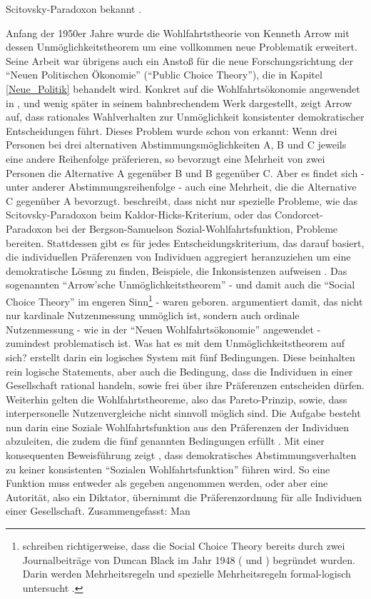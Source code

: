 Scitovsky-Paradoxon bekannt \parencite[S. 12]{Suzumura2016}.

Anfang der 1950er Jahre wurde die Wohlfahrtstheorie von Kenneth Arrow mit dessen Unmöglichkeitstheorem um eine vollkommen neue Problematik erweitert. Seine Arbeit war übrigens auch ein Anstoß für die neue Forschungsrichtung der "`Neuen Politischen Ökonomie"' ("`Public Choice Theory"'), die in Kapitel \ref{Neue_Politik} behandelt wird. Konkret auf die Wohlfahrtsökonomie angewendet in \textcite[S. 329]{Arrow1950}, und wenig später in seinem bahnbrechendem Werk \parencite{Arrow1951} dargestellt, zeigt Arrow auf, dass rationales Wahlverhalten zur Unmöglichkeit konsistenter demokratischer Entscheidungen führt. Dieses Problem wurde schon von \textcite{Condorcet1785} erkannt: Wenn drei Personen bei drei alternativen Abstimmungsmöglichkeiten A, B und C jeweils eine andere Reihenfolge präferieren, so bevorzugt eine Mehrheit von zwei Personen die Alternative A gegenüber B und B gegenüber C. Aber es findet sich - unter anderer Abstimmungsreihenfolge - auch eine Mehrheit, die die Alternative C gegenüber A bevorzugt. \textcite{Arrow1950} beschreibt, dass nicht nur spezielle Probleme, wie das Scitovsky-Paradoxon beim Kaldor-Hicks-Kriterium, oder das Condorcet-Paradoxon bei der Bergson-Samuelson Sozial-Wohlfahrtsfunktion, Probleme bereiten. Stattdessen gibt es für jedes Entscheidungskriterium, das darauf basiert, die individuellen Präferenzen von Individuen aggregiert heranzuziehen um eine demokratische Lösung zu finden, Beispiele, die Inkonsistenzen aufweisen \parencite[S. 330]{Arrow1950}. Das sogenannten "`Arrow'sche Unmöglichkeitstheorem"' - und damit auch die "`Social Choice Theory"' im engeren Sinn\footnote{\textcite{Fleurbaey2021} schreiben richtigerweise, dass die Social Choice Theory bereits durch zwei Journalbeiträge von Duncan Black im Jahr 1948 (\textcite{Black1948a} und \textcite{Black1948b}) begründet wurden. Darin werden Mehrheitsregeln und spezielle Mehrheitsregeln formal-logisch untersucht \parencite{Fleurbaey2021}.} - waren geboren. \textcite{Arrow1950} argumentiert damit, das nicht nur kardinale Nutzenmessung unmöglich ist, sondern auch ordinale Nutzenmessung - wie in der "`Neuen Wohlfahrtsökonomie"' angewendet - zumindest problematisch ist. Was hat es mit dem Unmöglichkeitstheorem auf sich? \textcite{Arrow1950} erstellt darin ein logisches System mit fünf Bedingungen. Diese beinhalten rein logische Statements, aber auch die Bedingung, dass die Individuen in einer Gesellschaft rational handeln, sowie frei über ihre Präferenzen entscheiden dürfen. Weiterhin gelten die Wohlfahrtstheoreme, also das Pareto-Prinzip, sowie, dass  interpersonelle Nutzenvergleiche nicht sinnvoll möglich sind. Die Aufgabe besteht nun darin eine Soziale Wohlfahrtsfunktion aus den Präferenzen der Individuen abzuleiten, die zudem die fünf genannten Bedingungen erfüllt \parencite[S. 339]{Arrow1950}. Mit einer konsequenten Beweisführung zeigt \textcite[S. 339ff]{Arrow1950}, dass demokratisches Abstimmungsverhalten zu keiner konsistenten "`Sozialen Wohlfahrtsfunktion"' führen wird. So eine Funktion muss entweder als gegeben angenommen werden, oder aber eine Autorität, also ein Diktator, übernimmt die Präferenzordnung für alle Individuen einer Gesellschaft. Zusammengefasst: Man 